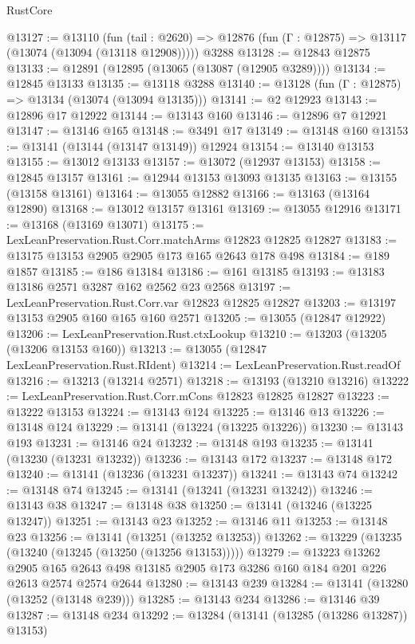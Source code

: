 \begin{lexlean}{RustCore}
\begin{coremodule}
@13127 := @13110
    (fun (tail : @2620) => @12876 (fun (Γ : @12875) => @13117 (@13074 (@13094 (@13118 @12908)))))
    @3288
@13128 := @12843 @12875
@13133 := @12891 (@12895 (@13065 (@13087 (@12905 @3289))))
@13134 := @12845 @13133
@13135 := @13118 @3288
@13140 := @13128 (fun (Γ : @12875) => @13134 (@13074 (@13094 @13135)))
@13141 := @2 @12923
@13143 := @12896 @17 @12922
@13144 := @13143 @160
@13146 := @12896 @7 @12921
@13147 := @13146 @165
@13148 := @3491 @17
@13149 := @13148 @160
@13153 := @13141 (@13144 (@13147 @13149)) @12924
@13154 := @13140 @13153
@13155 := @13012 @13133
@13157 := @13072 (@12937 @13153)
@13158 := @12845 @13157
@13161 := @12944 @13153 @13093 @13135
@13163 := @13155 (@13158 @13161)
@13164 := @13055 @12882
@13166 := @13163 (@13164 @12890)
@13168 := @13012 @13157 @13161
@13169 := @13055 @12916
@13171 := @13168 (@13169 @13071)
@13175 := LexLeanPreservation.Rust.Corr.matchArms @12823 @12825 @12827
@13183 := @13175 @13153 @2905 @2905 @173 @165 @2643 @178 @498
@13184 := @189 @1857
@13185 := @186 @13184
@13186 := @161 @13185
@13193 := @13183 @13186 @2571 @3287 @162 @2562 @23 @2568
@13197 := LexLeanPreservation.Rust.Corr.var @12823 @12825 @12827
@13203 := @13197 @13153 @2905 @160 @165 @160 @2571
@13205 := @13055 (@12847 @12922)
@13206 := LexLeanPreservation.Rust.ctxLookup
@13210 := @13203 (@13205 (@13206 @13153 @160))
@13213 := @13055 (@12847 LexLeanPreservation.Rust.RIdent)
@13214 := LexLeanPreservation.Rust.readOf
@13216 := @13213 (@13214 @2571)
@13218 := @13193 (@13210 @13216)
@13222 := LexLeanPreservation.Rust.Corr.mCons @12823 @12825 @12827
@13223 := @13222 @13153
@13224 := @13143 @124
@13225 := @13146 @13
@13226 := @13148 @124
@13229 := @13141 (@13224 (@13225 @13226))
@13230 := @13143 @193
@13231 := @13146 @24
@13232 := @13148 @193
@13235 := @13141 (@13230 (@13231 @13232))
@13236 := @13143 @172
@13237 := @13148 @172
@13240 := @13141 (@13236 (@13231 @13237))
@13241 := @13143 @74
@13242 := @13148 @74
@13245 := @13141 (@13241 (@13231 @13242))
@13246 := @13143 @38
@13247 := @13148 @38
@13250 := @13141 (@13246 (@13225 @13247))
@13251 := @13143 @23
@13252 := @13146 @11
@13253 := @13148 @23
@13256 := @13141 (@13251 (@13252 @13253))
@13262 := @13229 (@13235 (@13240 (@13245 (@13250 (@13256 @13153)))))
@13279 := @13223
    @13262
    @2905
    @165
    @2643
    @498
    @13185
    @2905
    @173
    @3286
    @160
    @184
    @201
    @226
    @2613
    @2574
    @2574
    @2644
@13280 := @13143 @239
@13284 := @13141 (@13280 (@13252 (@13148 @239)))
@13285 := @13143 @234
@13286 := @13146 @39
@13287 := @13148 @234
@13292 := @13284 (@13141 (@13285 (@13286 @13287)) @13153)

\end{coremodule}
\end{lexlean}
